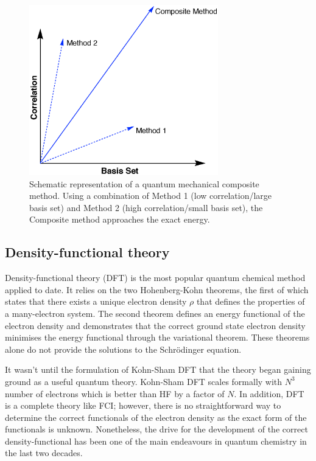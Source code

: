 \begin{figure}[htb]
  \centering
  \includegraphics[height=20em]{figures/compositemethods.eps}
  \caption[Schematic representation of a quantum mechanical composite method.]{Schematic representation of a quantum mechanical composite method. Using a combination of Method 1 (low correlation/large basis set) and Method 2 (high correlation/small basis set), the Composite method approaches the exact energy.}
  \label{fig:comp}
\end{figure}

\subsection{Density-functional theory}

Density-functional theory (DFT) is the most popular quantum chemical method applied to date. It relies on the two Hohenberg-Kohn theorems, the first of which states that there exists a unique electron density $\rho$ that defines the properties of a many-electron system. The second theorem defines an energy functional of the electron density and demonstrates that the correct ground state electron density minimises the energy functional through the variational theorem.\cite{Hohenberg1964,Koch2000} These theorems alone do not provide the solutions to the Schr{\"o}dinger equation.

It wasn't until the formulation of Kohn-Sham DFT\cite{Kohn1965} that the theory began gaining ground as a useful quantum theory. Kohn-Sham DFT scales formally with $N^3$ number of electrons\cite{Cramer2004} which is better than HF by a factor of $N$. In addition, DFT is a complete theory like FCI; however, there is no straightforward way to determine the correct functionals of the electron density as the exact form of the functionals is unknown. Nonetheless, the drive for the development of the correct density-functional has been one of the main endeavours in quantum chemistry in the last two decades.

